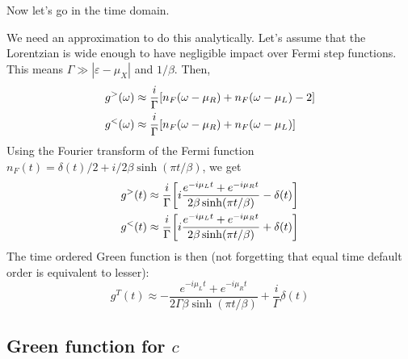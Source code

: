 \documentclass[12pt]{article}
\begin{document}
Now let's go in the time domain.

We need an approximation to do this analytically. Let's assume that the Lorentzian is wide enough to have negligible impact over Fermi step functions. This means $\Gamma \gg |\varepsilon - \mu_X|$ and $1/\beta$. Then,
\begin{align}
	g^>(\omega) \approx{}& \frac{i}{\Gamma} \qty[n_F(\omega - \mu_R) + n_F(\omega - \mu_L) - 2]
	\\
	g^<(\omega) \approx{}& \frac{i}{\Gamma} \qty[n_F(\omega - \mu_R) + n_F(\omega - \mu_L)]
\end{align}
Using the Fourier transform of the Fermi function $n_F(t) = \delta(t)/2 + i/2\beta \sinh(\pi t / \beta)$, we get
\begin{align}
	g^>(t) \approx{}& \frac{i}{\Gamma} \qty[i\frac{e^{-i\mu_L t} + e^{-i\mu_R t}}{2\beta \sinh(\pi t / \beta)} - \delta(t)]
	\\
	g^<(t) \approx{}& \frac{i}{\Gamma} \qty[i\frac{e^{-i\mu_L t} + e^{-i\mu_R t}}{2\beta \sinh(\pi t / \beta)} + \delta(t)]
\end{align}
The time ordered Green function is then (not forgetting that equal time default order is equivalent to lesser):
\begin{equation}
	g^T(t) \approx - \frac{e^{-i\mu_L t} + e^{-i\mu_R t}}{2\Gamma\beta \sinh(\pi t / \beta)} + \frac{i}{\Gamma} \delta(t)
\end{equation}


\subsection{Green function for $c$}
\end{document}
